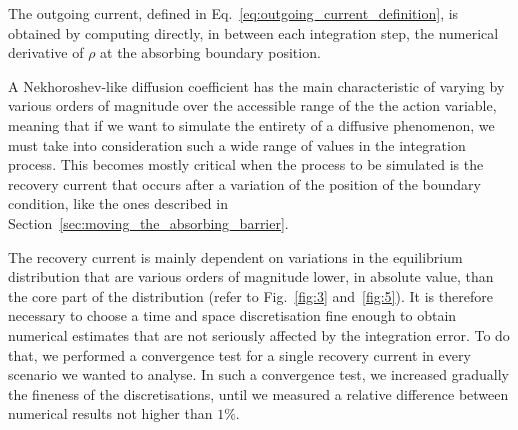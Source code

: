 The outgoing current, defined in Eq.~\eqref{eq:outgoing_current_definition}, is obtained by computing directly, in between each integration step, the numerical derivative of $\rho$ at the absorbing boundary position. 

A Nekhoroshev-like diffusion coefficient has the main characteristic of varying by various orders of magnitude over the accessible range of the the action variable, meaning that if we want to simulate the entirety of a diffusive phenomenon, we must take into consideration such a wide range of values in the integration process. This becomes mostly critical when the process to be simulated is the recovery current that occurs after a variation of the position of the boundary condition, like the ones described in Section~\ref{sec:moving_the_absorbing_barrier}.

The recovery current is mainly dependent on variations in the equilibrium distribution that are various orders of magnitude lower, in absolute value, than the core part of the distribution (refer to Fig.~\ref{fig:3} and~\ref{fig:5}). It is therefore necessary to choose a time and space discretisation fine enough to obtain numerical estimates that are not seriously affected by the integration error. To do that, we performed a convergence test for a single recovery current in every scenario we wanted to analyse. In such a convergence test, we increased gradually the fineness of the discretisations, until we measured a relative difference between numerical results not higher than $1\%$.

